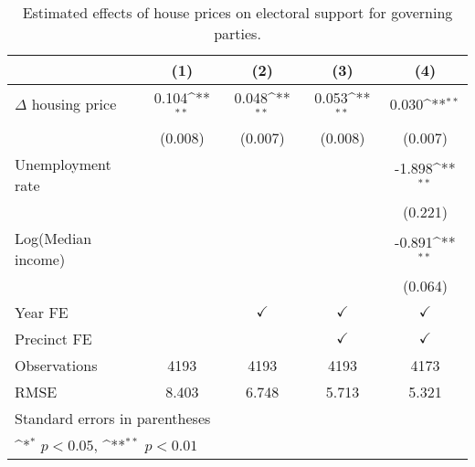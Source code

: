 \begin{table}[htbp]\centering
\def\sym#1{\ifmmode^{#1}\else\(^{#1}\)\fi}
\caption{Estimated effects of house prices on electoral support for governing parties.} \label{predv}
\begin{tabular}{l*{4}{c}}
\hline\hline
                    &\multicolumn{1}{c}{(1)}        &\multicolumn{1}{c}{(2)}        &\multicolumn{1}{c}{(3)}        &\multicolumn{1}{c}{(4)}        \\
\hline
$\Delta$ housing price&       0.104\sym{**}&       0.048\sym{**}&       0.053\sym{**}&       0.030\sym{**}\\
                    &     (0.008)        &     (0.007)        &     (0.008)        &     (0.007)        \\
[1em]
Unemployment rate   &                    &                    &                    &      -1.898\sym{**}\\
                    &                    &                    &                    &     (0.221)        \\
[1em]
Log(Median income)  &                    &                    &                    &      -0.891\sym{**}\\
                    &                    &                    &                    &     (0.064)        \\
[1em]
\hline Year FE      &                    &$\checkmark$        &$\checkmark$        &$\checkmark$        \\
[1em]
Precinct FE         &                    &                    &$\checkmark$        &$\checkmark$        \\
\hline
Observations        &        4193        &        4193        &        4193        &        4173        \\
RMSE                &       8.403        &       6.748        &       5.713        &       5.321        \\
\hline\hline
\multicolumn{5}{l}{\footnotesize Standard errors in parentheses}\\
\multicolumn{5}{l}{\footnotesize \sym{*} \(p<0.05\), \sym{**} \(p<0.01\)}\\
\end{tabular}
\end{table}
